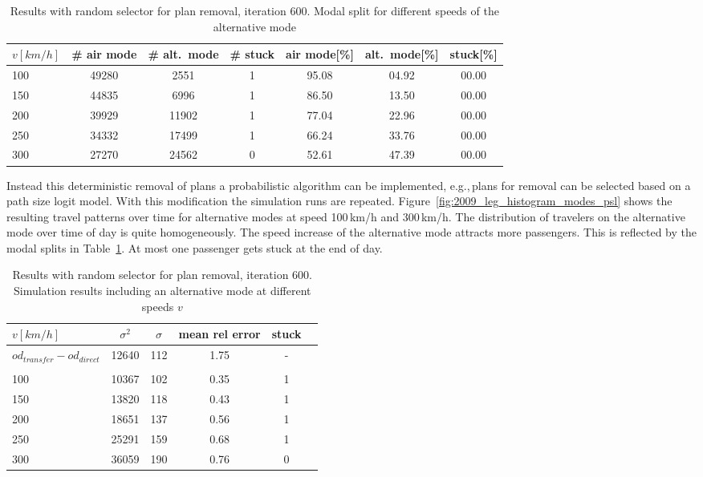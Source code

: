 \begin{table}[t]
	\centering
	\begin{tabular}{@{}l|ccc|ccc@{}}
		$v [km/h]$	& \# air mode  & \# alt.~mode & \# stuck & air mode[\%]  & alt.~mode[\%] & stuck[\%] \\
		\hline 
		100 & 49280 & 2551 & 1 & 95.08 & 04.92 & 00.00\\	%
		150 & 44835 & 6996 & 1 & 86.50 & 13.50 & 00.00\\	%
		200 & 39929 & 11902 & 1 & 77.04 & 22.96 & 00.00\\	%
		250 & 34332 & 17499 & 1 & 66.24 & 33.76 & 00.00\\	%
		300 & 27270 & 24562 & 0 & 52.61 & 47.39 & 00.00\\	%
	\end{tabular}
	\caption{Results with random selector for plan removal, iteration 600. Modal split for different speeds of the alternative mode}
	\label{tab:2009_results_train_modal_split_psl}
\end{table}


Instead this deterministic removal of plans a probabilistic algorithm can be implemented, e.g.,\,plans for removal can be selected based on a path size logit model. 
With this modification the simulation runs are repeated. 
Figure~\ref{fig:2009_leg_histogram_modes_psl} shows the resulting travel patterns over time for alternative modes at speed 100\,km/h and 300\,km/h.  
The distribution of travelers on the alternative mode over time of day is quite homogeneously. 
The speed increase of the alternative mode attracts more passengers. 
This is reflected by the modal splits in Table~\ref{tab:2009_results_train_modal_split_psl}. 
At most one passenger gets stuck at the end of day. 

\begin{table}[t]
\centering
		\begin{tabular}{@{}l|ccccc@{}}
			$v [km/h]$ & $\sigma^2$ & $\sigma$ & mean rel error  & stuck \\
\hline
 $od_{transfer} - od_{direct}$ &  12640 & 112 & 1.75 & - \\
 \\
 100	& 10367 & 102 & %
 0.35%
 &  %
 1
 \\	%
 150	& 13820 & 118 & 0.43 &  1 \\	%
 200 & 18651 & 137 & 0.56 &  1 \\	%
 250 & 25291 & 159 & 0.68 & 1 \\	%
 300 & 36059 & 190 & 0.76 & 0 \\	%
		\end{tabular}
		\caption{Results with random selector for plan removal, iteration 600. Simulation results including an alternative mode at different speeds $v$}
		\label{tab:2009_results_alternative_mode_psl}
\end{table}

